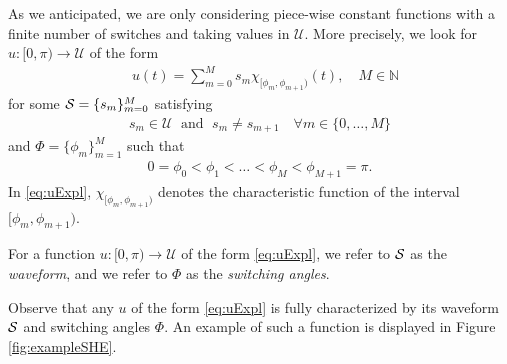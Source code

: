\documentclass[twocolumn]{autart}    %
\begin{document}
As we anticipated,  we are only considering piece-wise constant functions with a finite number of switches and taking values in $\mathcal{U}$.
More precisely, we look for $u: [0,\pi)\to \mathcal{U}$ of the form
\begin{align}\label{eq:uExpl}
	&u (t)= \sum_{m=0}^M s_m\chi_{[\phi_m,\phi_{m+1})} (t), \quad M\in\mathbb{N} 
\end{align}
for some $\mathcal{S} = \{ s_m\}_{m=0}^M$ satisfying
\begin{align*}
	s_m\in \mathcal{U} \; \text{ and } \; s_m\neq s_{m+1} \quad \forall m\in \{0,\ldots, M\}
\end{align*}
and $\Phi = \{ \phi_m\}_{m=1}^{M}$ such that
\begin{align*}
	0= \phi_0 < \phi_1 <\ldots < \phi_M < \phi_{M+1} = \pi .
\end{align*}
In \eqref{eq:uExpl}, $\chi_{[\phi_m,\phi_{m+1})}$ denotes the characteristic function of the interval $[\phi_m,\phi_{m+1})$. 

\bigskip

\begin{definition}\label{def: waveform and switching angles}
For a function $u: [0,\pi) \to \mathcal{U}$ of the form \eqref{eq:uExpl}, we refer to $\mathcal{S}$ as the \emph{waveform}, and we refer to $\Phi$ as the \emph{switching angles}.
\end{definition}

Observe that any $u$ of the form \eqref{eq:uExpl} is fully characterized by its waveform $\mathcal{S}$ and switching angles $\Phi$. An example of such a function is displayed in Figure \ref{fig:exampleSHE}. 
\end{document}
